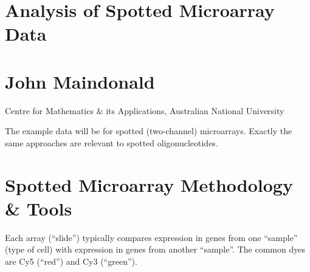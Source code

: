 \documentclass[a4paper,9pt]{article}
\begin{document}
\begin{center}
\section*{\LARGE \bf Analysis of Spotted  Microarray Data}

\section*{John Maindonald}
Centre for Mathematics \& its Applications, Australian National University
\end{center}
\vspace*{0.5cm}

The example data will be for spotted (two-channel) microarrays.  Exactly
the same approaches are relevant to spotted oligonucleotides.

\section{Spotted Microarray Methodology \& Tools}
Each array (``slide'') typically compares expression in genes from one
``sample'' (type of cell) with expression in genes from another
``sample''. The common dyes are Cy5 (``red'') and Cy3 (``green'').
\end{document}
